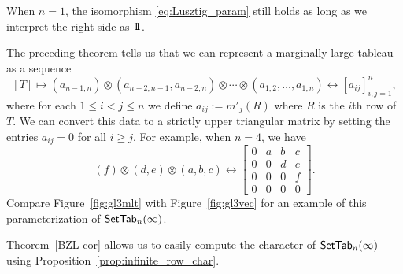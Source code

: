 \documentclass[11pt]{article}
\begin{document}
When $n=1$, the isomorphism \eqref{eq:Lusztig_param} still holds as long as we interpret the right side as $\one$.

The preceding theorem tells us that 
we can represent a marginally large tableau as a sequence
\[
[T] \mapsto (a_{n-1,n}) \otimes (a_{n-2,n-1}, a_{n-2,n}) \otimes \cdots \otimes (a_{1,2}, \dotsc, a_{1,n})
\longleftrightarrow
[a_{ij}]_{i,j=1}^n,
\]
where for each $1\leq i<j\leq n$ we define $a_{ij} := m'_{j}(R)$ where $R$ is the $i$th row of $T$.
We can convert this data to a strictly upper triangular matrix by setting the entries $a_{ij} = 0$ for all $i \geq j$.
For example, when $n = 4$, we have
\[
(f) \otimes (d,e) \otimes (a,b,c)
\longleftrightarrow
\begin{bmatrix}
0 & a & b & c \\
0 & 0 & d & e \\
0 & 0 & 0 & f \\
0 & 0 & 0 & 0
\end{bmatrix}.
\]
Compare Figure~\ref{fig:gl3mlt} with Figure~\ref{fig:gl3vec} for an example of this parameterization of $\mathsf{SetTab}_n(\infty)$.


Theorem~\ref{BZL-cor}   allows us to easily compute the character of $\mathsf{SetTab}_n(\infty)$ using Proposition~\ref{prop:infinite_row_char}.
\end{document}
